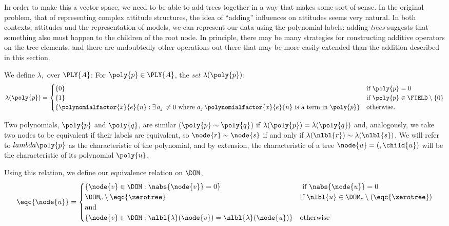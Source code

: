 
\begin{definition}\label{equivclass}
  In order to make this a vector space, we need to be able to add
  trees together in a way that makes some sort of sense.  In the
  original problem, that of representing complex attitude structures,
  the idea of ``adding'' influences on attitudes seems very natural.
  In both contexts, attitudes and the representation of models, we can
  represent our data using the polynomial labels: adding \emph{trees}
  suggests that something also must happen to the children of the root
  node. In principle, there may be many strategies for constructing
  additive operators on the tree elements, and there are undoubtedly
  other operations out there that may be more easily extended than the
  addition described in this section. 

  We define $\lambda,$ over $\PLY{A}$:
  For $\poly{p}\in\PLY{A}$, the \emph{set} $\lambda(\poly{p})$:
  \begin{equation*}
    \lambda(\poly{p}) = \begin{cases}
      \{0\} & \text{if } \poly{p} = 0 \\
      \{1\} & \text{if }\poly{p}\in\FIELD\setminus\{0\} \\
      \{\polynomialfactor{x}{e}{n}: \exists\, a_j\, \neq 0
      \text{ where $a_j\,\polynomialfactor{x}{e}{n}$ is a term in }
      \poly{p}\}&\text{otherwise}. \\
    \end{cases}
  \end{equation*}

  Two polynomials, $\poly{p}$ and $\poly{q}$, are similar ($\poly{p}
  \sim \poly{q}$) if $\lambda(\poly{p}) = \lambda(\poly{q})$ and,
  analogously, we take two nodes to be equivalent if their labels are
  equivalent, so $\node{r}\sim\node{s}$ if and only if
  $\lambda(\nlbl{r}) \sim \lambda(\nlbl{s})$. We will refer to
  $lambda{\poly{p}}$ as the characteristic of the polynomial, and by
  extension, the characteristic of a tree $\node{u} = (\label{u},
  \child{u})$ will be the characteristic of its polynomial $\poly{u}$.
  
  Using this relation, we define our equivalence relation on $\DOM$,
  \begin{equation}
    \eqc{\node{u}} = \begin{cases}
      \{\node{v} \in \DOM: \nabs{\node{v}} = 0\} & \text{ if } \nabs{\node{u}} = 0 \\
      \DOM_c\setminus\eqc{\zerotree} & \text{if } \nlbl{u}\in\DOM_c \setminus(\eqc{\zerotree})\\
      \text{\hfill and } & \\
      \{\node{v} \in \DOM: \nlbl{\lambda}({\node{v}}) = \nlbl{\lambda}({\node{u}})\} & \text{otherwise}
    \end{cases}
  \end{equation}


\end{definition}

